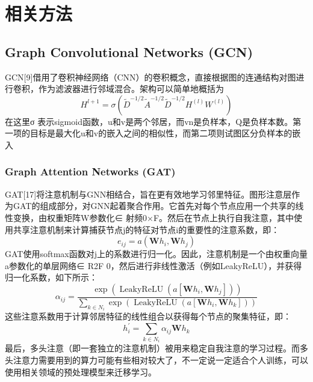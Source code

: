 \documentclass[conference]{IEEEtran}
\begin{document}
\section{相关方法}

\subsection{Graph Convolutional Networks (GCN)}
GCN[9]借用了卷积神经网络（CNN）的卷积概念，直接根据图的连通结构对图进行卷积，作为滤波器进行邻域混合。架构可以简单地概括为
\begin{equation}
H^{l+1}=\sigma\left(\tilde{D}^{-1 / 2} \tilde{A}^{-1 / 2} \tilde{D}^{-1 / 2} H^{(l)} W^{(l)}\right)
\end{equation}
在这里σ 表示sigmoid函数，u和v是两个邻居，而vn是负样本，Q是负样本数。第一项的目标是最大化u和v的嵌入之间的相似性，而第二项则试图区分负样本的嵌入

\subsubsection{Graph Attention Networks (GAT)}
GAT[17]将注意机制与GNN相结合，旨在更有效地学习邻里特征。图形注意层作为GAT的组成部分，对GNN起着聚合作用。它首先对每个节点应用一个共享的线性变换，由权重矩阵W参数化∈ 射频0×F。然后在节点上执行自我注意，其中使用共享注意机制来计算捕获节点j的特征对节点i的重要性的注意系数，即：
\begin{equation}
e_{i j}=a\left(\mathbf{W} h_{i}, \mathbf{W} h_{j}\right)
\end{equation}
GAT使用softmax函数对j上的系数进行归一化。因此，注意机制是一个由权重向量a参数化的单层网络∈ R2F 0，然后进行非线性激活（例如LeakyReLU），并获得归一化系数，如下所示：
\begin{equation}
\alpha_{i j}=\frac{\exp \left(\operatorname{LeakyReLU}\left(a\left[\mathbf{W} h_{i}, \mathbf{W} h_{j}\right]\right)\right)}{\sum_{k \in N_{i}} \exp \left(\operatorname{LeakyReLU}\left(a\left[\mathbf{W} h_{i}, \mathbf{W} h_{k}\right]\right)\right)}
\end{equation}
这些注意系数用于计算邻居特征的线性组合以获得每个节点的聚集特征，即：
\begin{equation}
h_{i}^{\prime}=\sum_{k \in N_{i}} \alpha_{i j} \mathbf{W} h_{k}
\end{equation}
最后，多头注意（即一套独立的注意机制）被用来稳定自我注意的学习过程。而多头注意力需要用到的算力可能有些相对较大了，不一定说一定适合个人训练，可以使用相关领域的预处理模型来迁移学习。
\end{document}
